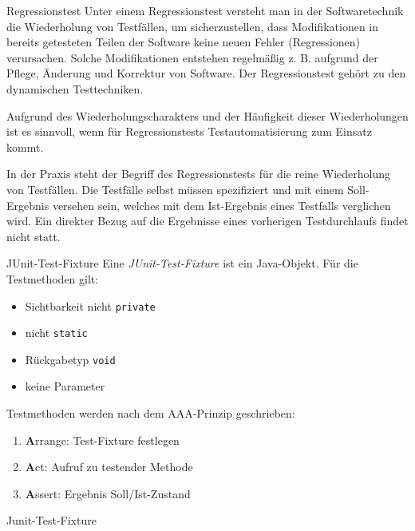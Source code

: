 \begin{bonus}{Regressionstest}
    Unter einem Regressionstest versteht man in der Softwaretechnik die Wiederholung von Testfällen, um sicherzustellen, dass Modifikationen in bereits getesteten Teilen der Software keine neuen Fehler (Regressionen) verursachen.
    Solche Modifikationen entstehen regelmäßig z. B. aufgrund der Pflege, Änderung und Korrektur von Software.
    Der Regressionstest gehört zu den dynamischen Testtechniken.

    Aufgrund des Wiederholungscharakters und der Häufigkeit dieser Wiederholungen ist es sinnvoll, wenn für Regressionstests Testautomatisierung zum Einsatz kommt.

    In der Praxis steht der Begriff des Regressionstests für die reine Wiederholung von Testfällen.
    Die Testfälle selbst müssen spezifiziert und mit einem Soll-Ergebnis versehen sein, welches mit dem Ist-Ergebnis eines Testfalls verglichen wird.
    Ein direkter Bezug auf die Ergebnisse eines vorherigen Testdurchlaufs findet nicht statt.
\end{bonus}

\begin{defi}{JUnit-Test-Fixture}
    Eine \emph{JUnit-Test-Fixture} ist ein Java-Objekt.
    Für die Testmethoden gilt:
    \begin{itemize}
        \item Sichtbarkeit nicht \texttt{private}
        \item nicht \texttt{static}
        \item Rückgabetyp \texttt{void}
        \item keine Parameter
    \end{itemize}

    Testmethoden werden nach dem AAA-Prinzip geschrieben:
    \begin{enumerate}
        \item \textbf{A}rrange: Test-Fixture festlegen
        \item \textbf{A}ct: Aufruf zu testender Methode
        \item \textbf{A}ssert: Ergebnis Soll/Ist-Zustand
    \end{enumerate}
\end{defi}

\begin{example}{Junit-Test-Fixture}
    

    
\end{example}

